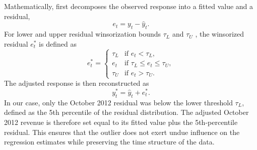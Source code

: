 Mathematically,  first decomposes the observed response into a fitted value and a residual,
\begin{equation}
e_t = y_t - \hat{y}_t.
\end{equation}
For lower and upper residual winsorization bounds $\tau_L$ and $\tau_U$ , the winsorized residual $e_t^\ast$ is defined as
\begin{equation}
e_t^\ast =
\begin{cases}
\tau_L & \text{if } e_t < \tau_L, \\
e_t & \text{if } \tau_L \le e_t \le \tau_U, \\
\tau_U & \text{if } e_t > \tau_U.
\end{cases}
\label{eq:residual_winsorization}
\end{equation}
The adjusted response is then reconstructed as
\begin{equation}
y_t^\ast = \hat{y}_t + e_t^\ast.
\label{eq:adjusted_response}
\end{equation}
In our case, only the October 2012 residual was below the lower threshold $\tau_L$, defined as the 5th percentile of the residual distribution. The adjusted October 2012 revenue is therefore set equal to its fitted value plus the 5th-percentile residual. This ensures that the outlier does not exert undue influence on the regression estimates while preserving the time structure of the data.

